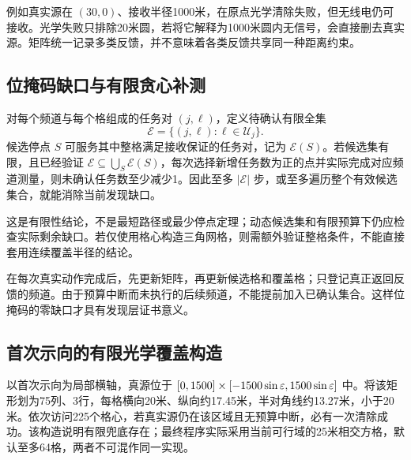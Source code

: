 例如真实源在 $(30,0)$、接收半径1000米，在原点光学清除失败，但无线电仍可接收。光学失败只排除20米圆，若将它解释为1000米圆内无信号，会直接删去真实源。矩阵统一记录多类反馈，并不意味着各类反馈共享同一种距离约束。

\subsection{位掩码缺口与有限贪心补测}
对每个频道与每个格组成的任务对 $(j,\ell)$，定义待确认有限全集
\begin{equation}
\mathcal E=\{(j,\ell):\ell\in\mathcal U_j\}.
\end{equation}
候选停点 $S$ 可服务其中整格满足接收保证的任务对，记为 $\mathcal E(S)$。若候选集有限，且已经验证 $\mathcal E\subseteq\bigcup_S\mathcal E(S)$，每次选择新增任务数为正的点并实际完成对应频道测量，则未确认任务数至少减少1。因此至多 $|\mathcal E|$ 步，或至多遍历整个有效候选集合，就能消除当前发现缺口。

这是有限性结论，不是最短路径或最少停点定理；动态候选集和有限预算下仍应检查实际剩余缺口。若仅使用格心构造三角网格，则需额外验证整格条件，不能直接套用连续覆盖半径的结论。

在每次真实动作完成后，先更新矩阵，再更新候选格和覆盖格；只登记真正返回反馈的频道。由于预算中断而未执行的后续频道，不能提前加入已确认集合。这样位掩码的零缺口才具有发现层证书意义。

\subsection{首次示向的有限光学覆盖构造}
以首次示向为局部横轴，真源位于 $[0,1500]\times[-1500\sin\varepsilon,1500\sin\varepsilon]$ 中。将该矩形划为75列、3行，每格横向20米、纵向约17.45米，半对角线约13.27米，小于20米。依次访问225个格心，若真实源仍在该区域且无预算中断，必有一次清除成功。该构造说明有限兜底存在；最终程序实际采用当前可行域的25米相交方格，默认至多64格，两者不可混作同一实现。
